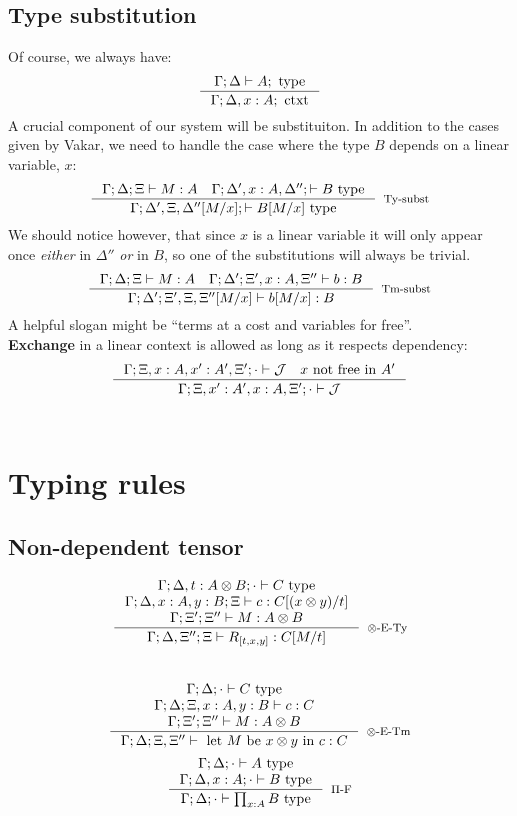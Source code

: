 \subsection*{Type substitution}
Of course, we always have:
\[
\inference{\Gamma; \Delta \vdash A; \text{ type}}
          {\Gamma; \Delta, x : A; \text{ ctxt} }
\]
A crucial component of our system will be substituiton. In addition to the cases given by Vakar, we need to handle the case where the type $B$ depends on a linear variable, $x$:\\
\[
\inference{\Gamma; \Delta; \Xi \vdash M: A \quad \Gamma; \Delta', x: A, \Delta''; \vdash B \text{ type}}
          {\Gamma; \Delta', \Xi, \Delta''[M/x]; \vdash B[M/x] \text{ type} }[Ty-subst]
\]
We should notice however, that since $x$ is a linear variable it will only appear once \textit{either} in $\Delta''$ \textit{or } in $B$, so one of the substitutions will always be trivial.
\[
\inference{  \Gamma; \Delta; \Xi \vdash M: A \quad \Gamma; \Delta';  \Xi', x : A, \Xi'' \vdash b : B}
          {\Gamma; \Delta'; \Xi', \Xi, \Xi''[M/x] \vdash b[M/x] : B}[Tm-subst]
\]
A helpful slogan might be ``terms at a cost and variables for free''.\\
\textbf{Exchange} in a linear context is allowed as long as it respects dependency:
\[
\inference{
  \Gamma; \Xi, x : A, x' : A', \Xi'; \cdot \vdash \mathcal{J}
\quad \text{$x$ not free in $A'$}}
{\Gamma; \Xi, x' : A', x : A, \Xi'; \cdot \vdash \mathcal{J}}
\]
\\
\section{Typing rules}
\subsection{Non-dependent tensor}
\[
\begin{split}
\inference {\Gamma; \Delta, t: A \otimes B; \cdot \vdash C \text{ type}\\
\Gamma;  \Delta, x: A, y: B; \Xi \vdash c : C[(x \otimes y)/t]\\
\Gamma;    \Xi'; \Xi'' \vdash M: A \otimes B\\
}
           {\Gamma; \Delta, \Xi''; \Xi \vdash R_{[t, x, y]} : C[M/t]
           }[$\otimes$-E-Ty]
\end{split}
\]\\
\[
\begin{split}
\inference {\Gamma; \Delta; \cdot \vdash C \text{ type}\\
\Gamma;  \Delta; \Xi, x: A, y: B \vdash c : C\\
\Gamma;    \Xi'; \Xi'' \vdash M: A \otimes B\\
}
           {\Gamma; \Delta; \Xi, \Xi'' \vdash \text{ let $M$ be $x \otimes y$ in }c : C
           }[$\otimes$-E-Tm]
\end{split}
\]
\[
\begin{split}
\inference {\Gamma; \Delta; \cdot \vdash A \text{ type}\\
\Gamma;  \Delta, x : A; \cdot \vdash B \text{ type}
  }
           {\Gamma; \Delta; \cdot \vdash \prod_{x: A}B \text{ type} 
             }[$\Pi$-F]
\end{split}
\]\\

